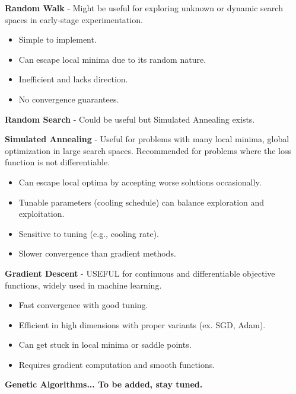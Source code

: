 \documentclass{article}
\begin{document}
\textbf{Random Walk} - Might be useful for exploring unknown or dynamic search spaces in early-stage experimentation.

\begin{itemize}[label=]
    \item Simple to implement.
    \item Can escape local minima due to its random nature.
\end{itemize}
\begin{itemize}[label=]
    \item Inefficient and lacks direction.
    \item No convergence guarantees.
\end{itemize}

\textbf{Random Search} - Could be useful but Simulated Annealing exists.\newline

\textbf{Simulated Annealing} - Useful for problems with many local minima, global optimization in large search spaces. Recommended for problems where the loss function is not differentiable.

\begin{itemize}[label=]
    \item Can escape local optima by accepting worse solutions occasionally.
    \item Tunable parameters (cooling schedule) can balance exploration and exploitation.
\end{itemize}
\begin{itemize}[label=]
    \item Sensitive to tuning (e.g., cooling rate).
    \item Slower convergence than gradient methods.
\end{itemize}

\textbf{Gradient Descent} - USEFUL for continuous and differentiable objective functions, widely used in machine learning.

\begin{itemize}[label=]
    \item Fast convergence with good tuning.
    \item Efficient in high dimensions with proper variants (ex. SGD, Adam).
\end{itemize}
\begin{itemize}[label=]
    \item Can get stuck in local minima or saddle points.
    \item Requires gradient computation and smooth functions.
\end{itemize}

\textbf{Genetic Algorithms... To be added, stay tuned.}
\end{document}
